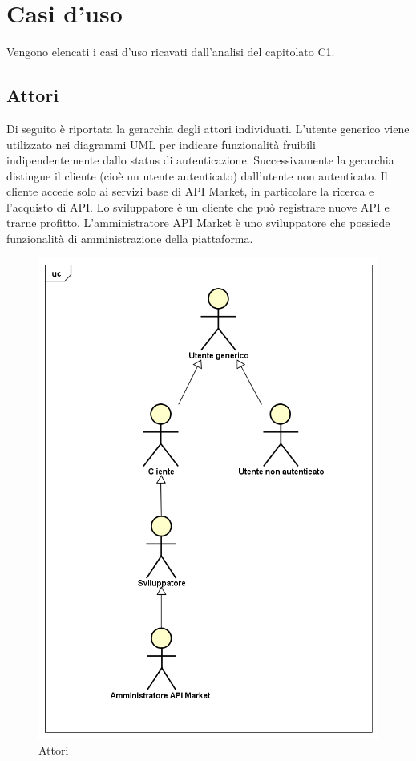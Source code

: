 \newpage
\section{Casi d'uso}
Vengono elencati i casi d'uso ricavati dall'analisi del capitolato C1.

\subsection{Attori}
Di seguito è riportata la gerarchia degli attori individuati. L'utente generico viene utilizzato nei diagrammi UML per indicare funzionalità fruibili indipendentemente dallo status di autenticazione. Successivamente la gerarchia distingue il cliente (cioè un utente autenticato) dall'utente non autenticato. Il cliente accede solo ai servizi base di API Market, in particolare la ricerca e l'acquisto di API. Lo sviluppatore è un cliente che può registrare nuove API e trarne profitto. L'amministratore API Market è uno sviluppatore che possiede funzionalità di amministrazione della piattaforma.

\label{Attori}

\begin{figure}[ht]
	\centering
	\includegraphics[scale=0.45]{UML/Attori.png}
	\caption{Attori}
\end{figure}


